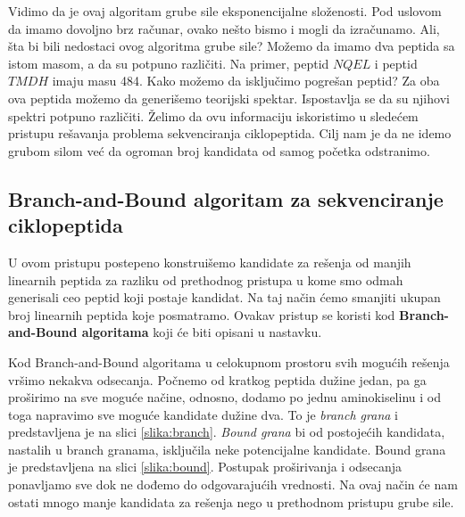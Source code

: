 Vidimo da je ovaj algoritam grube sile eksponencijalne složenosti. Pod uslovom da imamo dovoljno brz računar, ovako nešto bismo i mogli da izračunamo. Ali, šta bi bili nedostaci ovog algoritma grube sile? Možemo da imamo dva peptida sa istom masom, a da su potpuno različiti. Na primer, peptid $NQEL$ i peptid $TMDH$ imaju masu 484. Kako možemo da isključimo pogrešan peptid? Za oba ova peptida možemo da generišemo teorijski spektar. Ispostavlja se da su njihovi spektri potpuno različiti. Želimo da ovu informaciju iskoristimo u sledećem pristupu rešavanja problema sekvenciranja ciklopeptida. Cilj nam je da ne idemo grubom silom već da ogroman broj kandidata od samog početka odstranimo.

\subsection{Branch-and-Bound algoritam za sekvenciranje ciklopeptida}

U ovom pristupu postepeno konstruišemo kandidate za rešenja od manjih linearnih peptida za razliku od prethodnog pristupa u kome smo odmah generisali ceo peptid koji postaje kandidat. Na taj način ćemo smanjiti ukupan broj linearnih peptida koje posmatramo. Ovakav pristup se koristi kod \textbf{Branch-and-Bound algoritama} koji će biti opisani u nastavku.

Kod Branch-and-Bound algoritama u celokupnom prostoru svih mogućih rešenja vršimo nekakva odsecanja. Počnemo od kratkog peptida dužine jedan, pa ga proširimo na sve moguće načine, odnosno, dodamo po jednu aminokiselinu i od toga napravimo sve moguće kandidate dužine dva. To je \textit{branch grana} i predstavljena je na slici \ref{slika:branch}. \textit{Bound grana} bi od postojećih kandidata, nastalih u branch granama, isključila neke potencijalne kandidate. Bound grana je predstavljena na slici \ref{slika:bound}. Postupak proširivanja i odsecanja ponavljamo sve dok ne dođemo do odgovarajućih vrednosti. Na ovaj način će nam ostati mnogo manje kandidata za rešenja nego u prethodnom pristupu grube sile.

